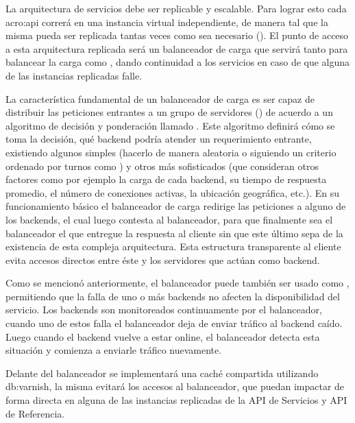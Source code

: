 La arquitectura de servicios debe ser replicable y escalable. Para lograr esto cada \gls{acro:api} correrá en una instancia virtual independiente, de manera tal que la misma pueda ser replicada tantas veces como sea necesario (). El punto de acceso a esta arquitectura replicada será un balanceador de carga que servirá tanto para balancear la carga como , dando continuidad a los servicios en caso de que alguna de las instancias replicadas falle.

La característica fundamental de un balanceador de carga es ser capaz de distribuir las peticiones entrantes a un grupo de servidores () de acuerdo a un algoritmo de decisión y ponderación llamado . Este algoritmo definirá cómo se toma la decisión, qué backend podría atender un requerimiento entrante, existiendo algunos simples (hacerlo de manera aleatoria o siguiendo un criterio ordenado por turnos como ) y otros más sofisticados (que consideran otros factores como por ejemplo la carga de cada backend, su tiempo de respuesta promedio, el número de conexiones activas, la ubicación geográfica, etc.). En su funcionamiento básico el balanceador de carga redirige las peticiones a alguno de los backends, el cual luego contesta al balanceador, para que finalmente sea el balanceador el que entregue la respuesta al cliente sin que este último sepa de la existencia de esta compleja arquitectura. Esta estructura transparente al cliente evita accesos directos entre éste y los servidores que actúan como backend.

Como se mencionó anteriormente, el balanceador puede también ser usado como , permitiendo que la falla de uno o más backends no afecten la disponibilidad del servicio. Los backends son monitoreados continuamente por el balanceador, cuando uno de estos falla el balanceador deja de enviar tráfico al backend caído. Luego cuando el backend vuelve a estar online, el balanceador detecta esta situación y comienza a enviarle tráfico nuevamente.

Delante del balanceador se implementará una caché compartida utilizando \gls{db:varnish}, la misma evitará los accesos al balanceador, que puedan impactar de forma directa en alguna de las instancias replicadas de la API de Servicios y API de Referencia.

